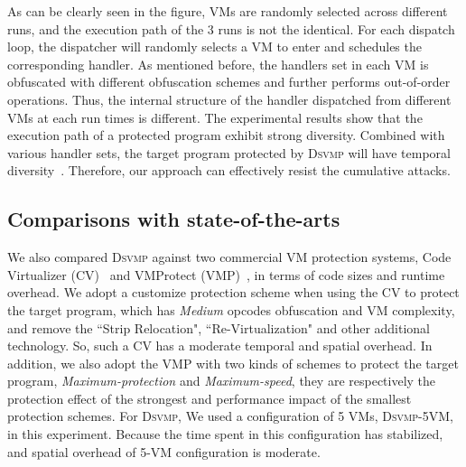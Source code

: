 \documentclass[preprint,12pt,3p]{elsarticle}
\newcommand{\DSVMP}{\textsc{Dsvmp}\xspace}
\newcommand\FIXME[1]{\textcolor{red}{FIX:}\textcolor{red}{#1}}
\begin{document}
As can be clearly seen in the figure, VMs are randomly selected across different runs,
and the execution path of the 3 runs is not the identical.
For each dispatch loop, the dispatcher will randomly selects a VM to enter and schedules the corresponding handler.
As mentioned before, the handlers set in each VM is obfuscated with different obfuscation schemes
and further performs out-of-order operations.
Thus, the internal structure of the handler dispatched from different VMs at each run times is different.
The experimental results show that the execution path of a protected program exhibit strong diversity.
Combined with various handler sets, the target program protected by \DSVMP will have temporal diversity~\cite{4collberg}.
Therefore, our approach can effectively resist the cumulative attacks.


\subsection{Comparisons with state-of-the-arts}\label{sec:comparetest}
We also compared \DSVMP against two commercial VM protection systems,
Code Virtualizer (CV)~\cite{2CV} and VMProtect (VMP)~\cite{3Vmprotect}, in terms of code sizes and runtime overhead.
We adopt a customize protection scheme when using the CV to protect the target program,
which has \emph{Medium} opcodes obfuscation and VM complexity,
and remove the ``Strip Relocation", ``Re-Virtualization" and other additional technology.
So, such a CV has a moderate temporal and spatial overhead.
In addition, we also adopt the VMP with two kinds of schemes to protect the target program,
\emph{Maximum-protection} and \emph{Maximum-speed},
they are respectively the protection effect of the strongest and performance impact of the smallest protection schemes.
For \DSVMP, We used a configuration of 5 VMs, \DSVMP-5VM, in this experiment.
Because the time spent in this configuration has stabilized, and spatial overhead of 5-VM configuration is moderate.
\end{document}
